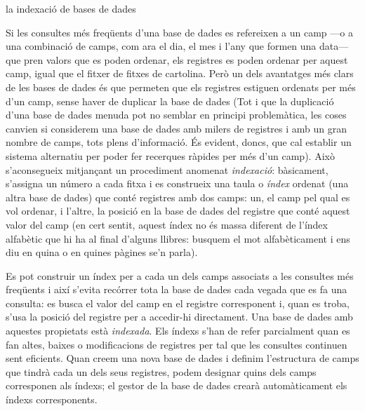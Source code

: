 \begin{persabermes}{la indexació de bases de dades}

  Si les consultes més freqüents d'una base de dades es refereixen a
  un camp ---o a una combinació de camps, com ara el dia, el mes i
  l'any que formen una data--- que pren valors que es poden ordenar,
  els registres es poden ordenar per aquest camp, igual que el fitxer
  de fitxes de cartolina. Però un dels avantatges més clars de les
  bases de dades és que permeten que els registres estiguen ordenats
  per més d'un camp, sense haver de duplicar la base de dades (Tot i
  que la duplicació d'una base de dades menuda pot no semblar en
  principi problemàtica, les coses canvien si considerem una base de
  dades amb milers de registres i amb un gran nombre de camps, tots
  plens d'informació.  És evident, doncs, que cal establir un sistema
  alternatiu per poder fer recerques ràpides per més d'un camp).  Això
  s'aconsegueix mitjançant un procediment anomenat \emph{indexació}:
  bàsicament, s'assigna un número a cada fitxa i es construeix una
  taula o \emph{índex} ordenat (una altra base de dades) que conté
  registres amb dos camps: un, el camp pel qual es vol ordenar, i
  l'altre, la posició en la base de dades del registre que conté
  aquest valor del camp (en cert sentit, aquest índex no és massa
  diferent de l'índex alfabètic que hi ha al final d'alguns llibres:
  busquem el mot alfabèticament i ens diu en quina o en quines pàgines
  se'n parla).

Es pot construir un índex per a cada un dels camps associats a les
consultes més freqüents i així s'evita recórrer tota la base de dades
cada vegada que es fa una consulta: es busca el valor del camp en el
registre corresponent i, quan es troba, s'usa la posició del registre
per a accedir-hi directament. Una base de dades amb aquestes
propietats està \emph{indexada}. 
Els índexs s'han de
refer parcialment quan es fan altes, baixes o modificacions de registres per tal que les
consultes continuen sent eficients. Quan creem una nova base de dades i definim
l'estructura de camps que tindrà cada un dels seus registres, podem
designar quins dels camps corresponen als índexs; el gestor de la base
de dades crearà automàticament els índexs corresponents.


\end{persabermes}

